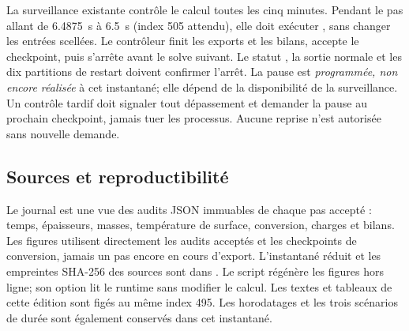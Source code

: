 La surveillance existante contrôle le calcul toutes les cinq minutes.
Pendant le pas allant de \SI{6.4875}{s} à \SI{6.5}{s} (index 505 attendu),
elle doit exécuter , sans changer les entrées scellées.
Le contrôleur finit les exports et les bilans, accepte le checkpoint, puis
s'arrête avant le solve suivant. Le statut ,
la sortie normale et les dix partitions de restart doivent confirmer l'arrêt.
La pause est \emph{programmée, non encore réalisée} à cet instantané;
elle dépend de la disponibilité de la surveillance. Un contrôle tardif doit
signaler tout dépassement et demander la pause au prochain checkpoint,
jamais tuer les processus. Aucune reprise n'est autorisée sans nouvelle demande.

\subsection{Sources et reproductibilité}
Le journal  est une vue des audits JSON immuables
de chaque pas accepté : temps, épaisseurs, masses, température de surface,
conversion, charges et bilans. Les figures utilisent directement les audits
acceptés et les checkpoints de conversion, jamais un pas encore en cours
d'export. L'instantané réduit et les empreintes SHA-256 des sources sont dans
. Le script
 régénère les figures hors ligne; son option
 lit le runtime sans modifier le calcul. Les textes et tableaux
de cette édition sont figés au même index 495. Les horodatages et les trois
scénarios de durée sont également conservés dans cet instantané.
\clearpage
